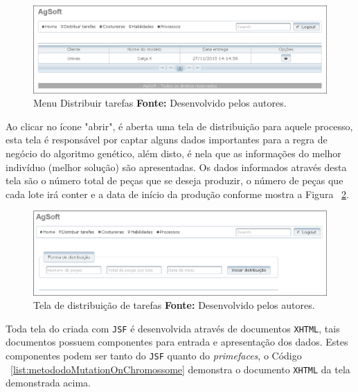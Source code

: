 \begin{figure}[h!]
	\centerline{\includegraphics[scale=0.5]{./imagens/tela_distribuicao_processos.png}}
	\caption[Menu Distribuir tarefas]
	{Menu Distribuir tarefas
		\textbf{Fonte:} Desenvolvido pelos autores.}
	\label{fig:tela_dis_processos}
\end{figure}

\par Ao clicar no ícone "abrir", é aberta uma tela de distribuição para aquele processo, esta tela é responsável por captar alguns
dados importantes para a regra de negócio do algoritmo genético, além disto, é nela que as informações do melhor indivíduo (melhor
solução) são apresentadas.  Os dados informados através desta tela são o número total de peças que se deseja produzir, o número de 
peças que cada lote irá conter e a data de início da produção conforme mostra a Figura ~\ref{fig:tela_dis_open}.


\begin{figure}[h!]
	\centerline{\includegraphics[scale=0.5]{./imagens/tela_distribuicao_open.png}}
	\caption[Tela de distribuição de tarefas]
	{Tela de distribuição de tarefas
		\textbf{Fonte:} Desenvolvido pelos autores.}
	\label{fig:tela_dis_open}
\end{figure}

\par Toda tela do criada com \texttt{JSF} é desenvolvida através de documentos \texttt{XHTML}, tais documentos possuem componentes para entrada e apresentação dos dados. Estes componentes podem ser tanto do \texttt{JSF} quanto do \textit{primefaces}, o Código ~\ref{list:metododoMutationOnChromossome} demonstra o documento \texttt{XHTML} da tela demonstrada acima.

